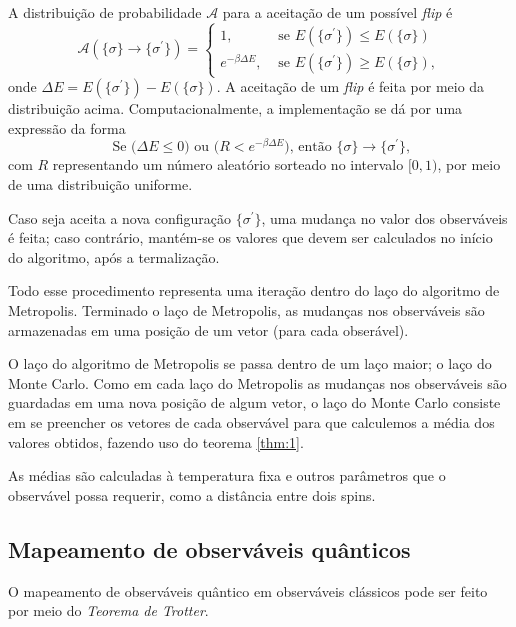 A distribuição de probabilidade $\mathcal{A}$ para a aceitação de um possível \textit{flip} é
\begin{equation*}
	\mathcal{A}(\{ \sigma \} \to \{ \sigma^\prime \}) = 
	\begin{cases}
		1, & \text{ se } E(\{ \sigma^\prime \}) \leq E(\{ \sigma \}) \\
		e^{-\beta \Delta E}, & \text{ se } E(\{ \sigma^\prime \}) \geq E(\{ \sigma \})	,
	\end{cases}
\end{equation*} 
onde $\Delta E = E(\{ \sigma^\prime \}) - E(\{ \sigma \}) $. 
A aceitação de um \textit{flip} é feita por meio da distribuição acima. Computacionalmente, a implementação se dá por uma expressão da forma
\begin{equation*}
	\text{ Se ($\Delta E \leq 0$) ou ($R < e^{-\beta \Delta E}$), então $\{ \sigma \} \to \{ \sigma^\prime \}$} ,
\end{equation*}
com $R$ representando um número aleatório sorteado no intervalo $[0, 1)$, por meio de uma distribuição uniforme. 

Caso seja aceita a nova configuração $\{ \sigma^\prime \}$, uma mudança no valor dos observáveis é feita; caso contrário, mantém-se os valores que devem ser calculados no início do algoritmo, após a termalização. 

Todo esse procedimento representa uma iteração dentro do laço do algoritmo de Metropolis. Terminado o laço de Metropolis, as mudanças nos observáveis são armazenadas em uma posição de um vetor (para cada obserável).

O laço do algoritmo de Metropolis se passa dentro de um laço maior; o laço do Monte Carlo. Como em cada laço do Metropolis as mudanças nos observáveis são guardadas em uma nova posição de algum vetor, o laço do Monte Carlo consiste em se preencher os vetores de cada observável para que calculemos a média dos valores obtidos, fazendo uso do teorema \ref{thm:1}. 

As médias são calculadas à temperatura fixa e outros parâmetros que o observável possa requerir, como a distância entre dois spins. 



\subsection{Mapeamento de observáveis quânticos}
\label{subsec:MapeamentoDeObservaveisQuanticos}

O mapeamento de observáveis quântico em observáveis clássicos pode ser feito por meio do \textit{Teorema de Trotter}. 

